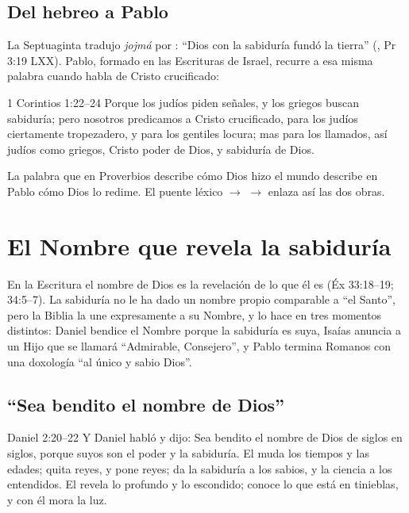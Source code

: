 \subsection{Del hebreo a Pablo}

La Septuaginta tradujo \emph{jojmá} por : ``Dios con la sabiduría fundó la tierra'' (, Pr 3:19 LXX). Pablo, formado en las Escrituras de Israel, recurre a esa misma palabra cuando habla de Cristo crucificado:

\begin{verso}{1 Corintios 1:22–24}
Porque los judíos piden señales, y los griegos buscan sabiduría; pero nosotros predicamos a Cristo crucificado, para los judíos ciertamente tropezadero, y para los gentiles locura; mas para los llamados, así judíos como griegos, Cristo poder de Dios, y sabiduría de Dios.
\end{verso}

La palabra que en Proverbios describe cómo Dios hizo el mundo describe en Pablo cómo Dios lo redime. El puente léxico  $\rightarrow$  $\rightarrow$  enlaza así las dos obras.

\section{El Nombre que revela la sabiduría}

En la Escritura el nombre de Dios es la revelación de lo que él es (Éx 33:18--19; 34:5--7). La sabiduría no le ha dado un nombre propio comparable a ``el Santo'', pero la Biblia la une expresamente a su Nombre, y lo hace en tres momentos distintos: Daniel bendice el Nombre porque la sabiduría es suya, Isaías anuncia a un Hijo que se llamará ``Admirable, Consejero'', y Pablo termina Romanos con una doxología ``al único y sabio Dios''.

\subsection{“Sea bendito el nombre de Dios”}
\begin{verso}{Daniel 2:20–22}
Y Daniel habló y dijo: Sea bendito el nombre de Dios de siglos en siglos, porque suyos son el poder y la sabiduría. El muda los tiempos y las edades; quita reyes, y pone reyes; da la sabiduría a los sabios, y la ciencia a los entendidos. El revela lo profundo y lo escondido; conoce lo que está en tinieblas, y con él mora la luz.
\end{verso}

